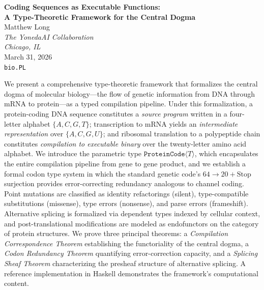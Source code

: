 \documentclass[12pt,a4paper]{article}
\theoremstyle{definition}
\begin{document}
\onehalfspacing

\begin{center}
  {\LARGE\bfseries Coding Sequences as Executable Functions:\\[4pt]
   A Type-Theoretic Framework for the Central Dogma}\\[16pt]
  {\large Matthew Long}\\[4pt]
  {\itshape The YonedaAI Collaboration}\\
  {\itshape Chicago, IL}\\[8pt]
  {\small March 31, 2026}\\[4pt]
  {\small\texttt{bio.PL}}
\end{center}

\vspace{8pt}

\begin{onecolabstract}
\noindent
We present a comprehensive type-theoretic framework that formalizes the central dogma of molecular biology---the flow of genetic information from DNA through mRNA to protein---as a typed compilation pipeline.
Under this formalization, a protein-coding DNA sequence constitutes a \emph{source program} written in a four-letter alphabet $\{A,C,G,T\}$; transcription to mRNA yields an \emph{intermediate representation} over $\{A,C,G,U\}$; and ribosomal translation to a polypeptide chain constitutes \emph{compilation to executable binary} over the twenty-letter amino acid alphabet.
We introduce the parametric type $\texttt{ProteinCode}\langle T\rangle$, which encapsulates the entire compilation pipeline from gene to gene product, and we establish a formal codon type system in which the standard genetic code's $64 \to 20+\text{Stop}$ surjection provides error-correcting redundancy analogous to channel coding.
Point mutations are classified as identity refactorings (silent), type-compatible substitutions (missense), type errors (nonsense), and parse errors (frameshift).
Alternative splicing is formalized via dependent types indexed by cellular context, and post-translational modifications are modeled as endofunctors on the category of protein structures.
We prove three principal theorems: a \emph{Compilation Correspondence Theorem} establishing the functoriality of the central dogma, a \emph{Codon Redundancy Theorem} quantifying error-correction capacity, and a \emph{Splicing Sheaf Theorem} characterizing the presheaf structure of alternative splicing.
A reference implementation in Haskell demonstrates the framework's computational content.
\end{onecolabstract}
\end{document}
